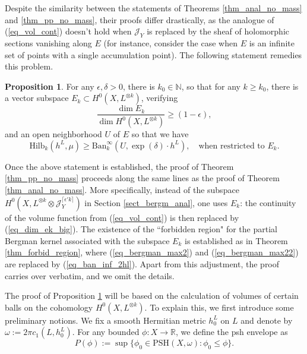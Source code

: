 \documentclass[12pt]{article}
\numberwithin{equation}{section}
\theoremstyle{theorem}
\theoremstyle{definition}
\newtheorem{prop}[thm]{Proposition}
\theoremstyle{remark}
\newcommand{\real}{\mathbb{R}}
\newcommand{\nat}{\mathbb{N}}
\begin{document}
	Despite the similarity between the statements of Theorems \ref{thm_anal_no_mass} and \ref{thm_pp_no_mass}, their proofs differ drastically, as the analogue of (\ref{eq_vol_cont}) doesn't hold when $\mathcal{J}_{Y}$ is replaced by the sheaf of holomorphic sections vanishing along $E$ (for instance, consider the case when $E$ is an infinite set of points with a single accumulation point).
	The following statement remedies this problem.
	\begin{prop}\label{prop_ban_inf_2hl}
		For any $\epsilon, \delta > 0$, there is $k_0 \in \nat$, so that for any $k \geq k_0$, there is a vector subspace $E_k \subset H^0(X, L^{\otimes k})$, verifying 
		\begin{equation}\label{eq_dim_ek_big}
			\frac{\dim E_k}{\dim H^0(X, L^{\otimes k})} \geq (1 - \epsilon),
		\end{equation}
		and an open neighborhood $U$ of $E$ so that we have
		\begin{equation}\label{eq_ban_inf_2hl}
			{\textrm{Hilb}}_k(h^L, \mu)
			\geq 
			{\textrm{Ban}}_k^{\infty}(U, \exp(\delta) \cdot h^L), \quad \text{when restricted to } E_k.
		\end{equation}
	\end{prop}
	Once the above statement is established, the proof of Theorem \ref{thm_pp_no_mass} proceeds along the same lines as the proof of Theorem \ref{thm_anal_no_mass}. 
	More specifically, instead of the subspace $H^0(X, L^{\otimes k} \otimes \mathcal{J}_{Y}^{\lceil \epsilon' k \rceil})$ in Section \ref{sect_bergm_anal}, one uses $E_k$: the continuity of the volume function from (\ref{eq_vol_cont}) is then replaced by (\ref{eq_dim_ek_big}).
	The existence of the “forbidden region" for the partial Bergman kernel associated with the subspace $E_k$ is established as in Theorem \ref{thm_forbid_region}, where (\ref{eq_bergman_max2}) and (\ref{eq_bergman_max22}) are replaced by (\ref{eq_ban_inf_2hl}). Apart from this adjustment, the proof carries over verbatim, and we omit the details.
	\par 
	The proof of Proposition \ref{prop_ban_inf_2hl} will be based on the calculation of volumes of certain balls on the cohomology $H^0(X, L^{\otimes k})$.
	To explain this, we first introduce some preliminary notions.
	We fix a smooth Hermitian metric $h^L_0$ on $L$ and denote by $\omega := 2 \pi c_1(L, h^L_0)$.
	For any bounded $\phi : X \to \real$, we define the psh envelope as
	\begin{equation}\label{defn_env_sic}
		P(\phi)
		:=
		\sup \Big\{
			\phi_0 \in {\textrm{PSH}}(X, \omega) : \phi_0 \leq \phi
		\Big\}.
	\end{equation}
\end{document}
